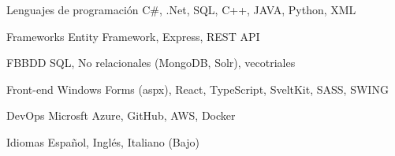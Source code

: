 

\begin{cvskills}
    \cvskill
    {Lenguajes de programación} %
    {C\#, .Net, SQL, C++, JAVA, Python, XML} %

    \cvskill
    {Frameworks} %
    {Entity Framework, Express, REST API} %

    \cvskill
    {FBBDD} %
    {SQL, No relacionales (MongoDB, Solr), vecotriales} %

    \cvskill
    {Front-end} %
    {Windows Forms (aspx), React, TypeScript, SveltKit, SASS, SWING} %

    \cvskill
    {DevOps} %
    {Microsft Azure, GitHub, AWS, Docker} %

    \cvskill
    {Idiomas} %
    {Español, Inglés, Italiano (Bajo)} %
    
   

\end{cvskills}
